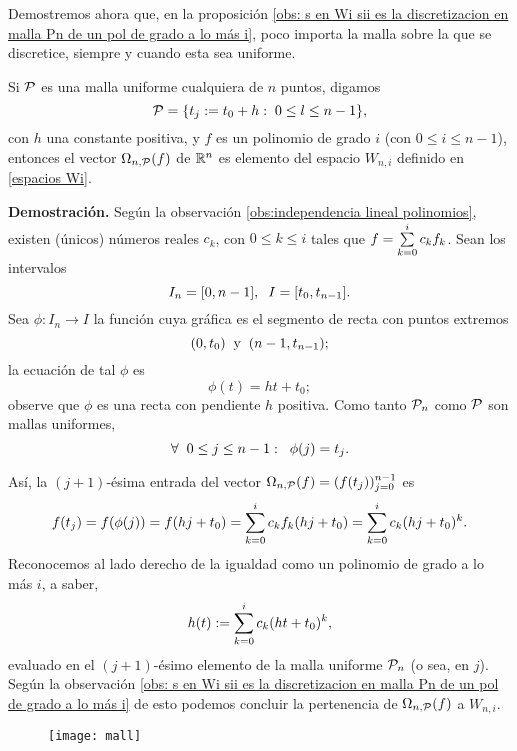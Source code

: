 \noindent Demostremos ahora que,
en la proposición
\ref{obs: s en Wi sii es la discretizacion en malla Pn de un pol de grado a lo más i},
poco importa
la malla sobre la que se discretice, siempre y
cuando esta sea uniforme.


\begin{prop} \label{Obs1}
Si $\mathcal{P}$ es una malla
uniforme cualquiera de $n$ puntos, digamos
\[
\mathcal{P}= \{ t_{j}:= t_{0}+h :\hspace{0.1cm} 0 \leq l \leq n-1 \},
\]
con $h$ una constante positiva, 
y $f$ es un polinomio de grado $i$
(con $0 \leq i \leq n-1$),
entonces el vector $\Omega_{n, \mathcal{P}}(f)$ de $\mathbb{R}^{n}$ 
es elemento del espacio $W_{n,i}$ definido en 
\eqref{espacios Wi}.
\end{prop}
\noindent
\textbf{Demostración.}
Según la observación \ref{obs:independencia lineal polinomios},
existen 
(únicos) números reales $c_{k}$, con $0 \leq k \leq i$
tales que 
$f= \sum\limits_{k=0}^{i}c_{k}f_{k}$.
Sean los intervalos
\[
I_{n}=[0,n-1], \hspace{0.2cm} I=[t_{0}, t_{n-1}].
\]
Sea $\phi:I_{n} \longrightarrow I$ la función cuya gráfica
es el segmento de recta con puntos extremos 
\[
(0, t_{0}) \hspace{0.2cm} \text{y} \hspace{0.2cm}
(n-1, t_{n-1});
\]
la ecuación de tal $\phi$ es
\[
\phi(t)=ht+t_{0};
\] observe que $\phi$
es una recta con pendiente $h$ positiva.
Como tanto
$\mathcal{P}_{n}$ como $\mathcal{P}$
son mallas uniformes, 
\[
\forall \hspace{0.2cm} 0 \leq j \leq n-1: \hspace{0.2cm} \phi(j)=t_{j}.
\] 

\noindent 
Así, la $(j+1)$-ésima entrada del
vector $\Omega_{n, \mathcal{P}}(f)=(f(t_{j}))_{j=0}^{n-1}$ es
\[
f(t_{j})= f (\phi (j))=
f(hj+t_{0})=
\sum\limits_{k=0}^{i}c_{k}f_{k}(hj+t_{0})
= \sum\limits_{k=0}^{i}c_{k}(hj+t_{0})^{k}.
\]
Reconocemos al lado derecho de la igualdad como un polinomio
de grado a lo más $i$, a saber,
\[
h(t):= \sum\limits_{k=0}^{i}c_{k}(ht+t_{0})^{k},
\]
evaluado en el $(j+1)$-ésimo elemento 
de la malla uniforme $\mathcal{P}_{n}$
(o sea, en $j$). Según la observación
\ref{obs: s en Wi sii es la discretizacion en malla Pn de un pol de grado a lo más i}
de esto podemos concluir la pertenencia de 
$\Omega_{n, \mathcal{P}}(f)$ a $W_{n,i}$. \\
\QEDB
\vspace{0.2cm}

\begin{figure}[H]
    \texttt{[image: mall]} 
 \end{figure}
 

